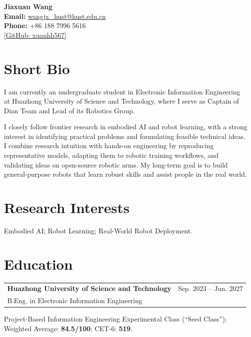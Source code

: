 \documentclass[10pt, a4paper]{article}
\begin{document}
{\LARGE \textbf{Jiaxuan Wang}}\\[0.3em]
\textbf{Email:} \href{mailto:wangjx_hust@hust.edu.cn}{wangjx\_hust@hust.edu.cn}\\
\textbf{Phone:} +86 188 7996 5616\\
\href{https://github.com/xuanhh567}{[GitHub: xuanhh567]}

\section{Short Bio}
I am currently an undergraduate student in Electronic Information Engineering at Huazhong University of Science and Technology, where I serve as Captain of Dian Team and Lead of its Robotics Group.

I closely follow frontier research in embodied AI and robot learning, with a strong interest in identifying practical problems and formulating feasible technical ideas. I combine research intuition with hands-on engineering by reproducing representative models, adapting them to robotic training workflows, and validating ideas on open-source robotic arms. My long-term goal is to build general-purpose robots that learn robust skills and assist people in the real world.

\section{Research Interests}
Embodied AI; Robot Learning; Real-World Robot Deployment.

\section{Education}
\begin{tabularx}{\textwidth}{@{}>{\raggedright\arraybackslash}X r@{}}
\textbf{Huazhong University of Science and Technology} & Sep. 2023 -- Jun. 2027 \\
B.Eng. in Electronic Information Engineering & \\
\end{tabularx}
Project-Based Information Engineering Experimental Class (``Seed Class''); Weighted Average: \textbf{84.5/100}; CET-6: \textbf{519}.
\end{document}
